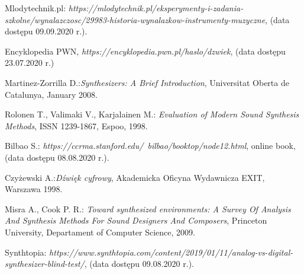 \documentclass[nostrict]{szablonPG}
\begin{document}



	\setcounter{page}{3}
	\let\cleardoublepage\clearpage
	
	
	\tableofcontents    %
	
%	
	
	
	
	
	
	
	
	
	
%	
	
	

	\listoffigures      %
	\listoftables

	\begin{thebibliography}{20}                      %
		\small              %
		Mlodytechnik.pl: \emph{https://mlodytechnik.pl/eksperymenty-i-zadania-szkolne/wynalazczosc/29983-historia-wynalazkow-instrumenty-muzyczne}, (data dostępu 09.09.2020 r.).
		
		Encyklopedia PWN, \emph{https://encyklopedia.pwn.pl/haslo/dzwiek}, (data dostępu 23.07.2020 r.)
		
		Martinez-Zorrilla D.:\emph{Synthesizers: A Brief Introduction}, Universitat Oberta de Catalunya, January 2008.

		Rolonen T., Valimaki V., Karjalainen M.: \emph{Evaluation of Modern Sound Synthesis Methods}, ISSN 1239-1867, Espoo, 1998.

		Bilbao S.: \emph{https://ccrma.stanford.edu/~bilbao/booktop/node12.html}, online book, (data dostępu 08.08.2020 r.).
		
		Czyżewski A.:\emph{Dźwięk cyfrowy}, Akademicka Oficyna Wydawnicza EXIT, Warszawa 1998.
		 
		Misra A., Cook P. R.: \emph{Toward synthesized environments: A Survey Of Analysis And Synthesis Methods For Sound Designers And Composers}, Princeton University, Departament of Computer Science, 2009.
		
		Synthtopia: \emph{https://www.synthtopia.com/content/2019/01/11/analog-vs-digital-synthesizer-blind-test/}, (data dostępu 09.08.2020 r.).


\end{thebibliography}
\end{document}
